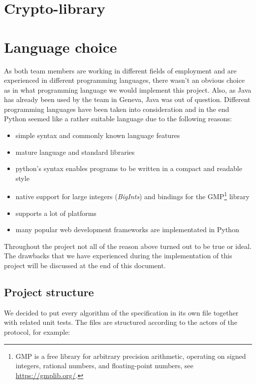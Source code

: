 \section{Crypto-library}
\section{Language choice}
As both team members are working in different fields of employment and are experienced in different programming languages, there wasn't an obvious choice as in what programming language we would implement this project. Also, as Java has already been used by the team in Geneva, Java was out of question. Different programming languages have been taken into consideration and in the end Python seemed like a rather suitable language due to the following reasons:

\begin{itemize}
	\item simple syntax and commonly known language features
	\item mature language and standard libraries
	\item python's syntax enables programs to be written in a compact and readable style
	\item native support for large integers (\textit{BigInts}) and bindings for the GMP\footnote{GMP is a free library for arbitrary precision arithmetic, operating on signed integers, rational numbers, and floating-point numbers, see \url{https://gmplib.org/}.} library
	\item supports a lot of platforms
	\item many popular web development frameworks are implementated in Python
\end{itemize}

Throughout the project not all of the reason above turned out to be true or ideal. The drawbacks that we have experienced during the implementation of this project will be discussed at the end of this document.

\subsection{Project structure}
We decided to put every algorithm of the specification in its own file together with related unit tests. The files are structured according to the actors of the protocol, for example:

